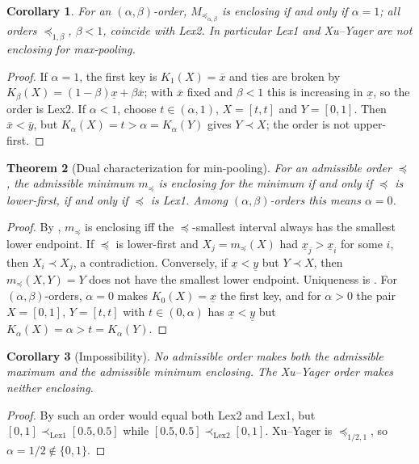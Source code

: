 \documentclass[preprint,12pt]{elsarticle}
\newtheorem{theorem}{Theorem}[section]
\newtheorem{corollary}[theorem]{Corollary}
\theoremstyle{definition}
\newcommand{\lo}[1]{\underline{#1}}
\newcommand{\up}[1]{\overline{#1}}
\begin{document}
\begin{corollary}\label{cor:ab}
For an $(\alpha,\beta)$-order, $M_{\preceq_{\alpha,\beta}}$ is enclosing if and only if $\alpha=1$; all orders $\preceq_{1,\beta}$, $\beta<1$, coincide with Lex2. In particular Lex1 and Xu--Yager are not enclosing for max-pooling.
\end{corollary}

\begin{proof}
If $\alpha=1$, the first key is $K_1(X)=\up x$ and ties are broken by $K_\beta(X)=(1-\beta)\lo x+\beta\up x$; with $\up x$ fixed and $\beta<1$ this is increasing in $\lo x$, so the order is Lex2. If $\alpha<1$, choose $t\in(\alpha,1)$, $X=[t,t]$ and $Y=[0,1]$. Then $\up x<\up y$, but $K_\alpha(X)=t>\alpha=K_\alpha(Y)$ gives $Y\prec X$; the order is not upper-first.
\end{proof}

\begin{theorem}[Dual characterization for min-pooling]\label{thm:min}
For an admissible order $\preceq$, the admissible minimum $m_\preceq$ is enclosing for the minimum if and only if $\preceq$ is lower-first, if and only if $\preceq$ is Lex1. Among $(\alpha,\beta)$-orders this means $\alpha=0$.
\end{theorem}

\begin{proof}
By , $m_\preceq$ is enclosing iff the $\preceq$-smallest interval always has the smallest lower endpoint. If $\preceq$ is lower-first and $X_j=m_\preceq(X)$ had $\lo x_j>\lo x_i$ for some $i$, then $X_i\prec X_j$, a contradiction. Conversely, if $\lo x<\lo y$ but $Y\prec X$, then $m_\preceq(X,Y)=Y$ does not have the smallest lower endpoint. Uniqueness is . For $(\alpha,\beta)$-orders, $\alpha=0$ makes $K_0(X)=\lo x$ the first key, and for $\alpha>0$ the pair $X=[0,1]$, $Y=[t,t]$ with $t\in(0,\alpha)$ has $\lo x<\lo y$ but $K_\alpha(X)=\alpha>t=K_\alpha(Y)$.
\end{proof}

\begin{corollary}[Impossibility]\label{cor:impossible}
No admissible order makes both the admissible maximum and the admissible minimum enclosing. The Xu--Yager order makes neither enclosing.
\end{corollary}

\begin{proof}
By  such an order would equal both Lex2 and Lex1, but $[0,1]\prec_{\mathrm{Lex1}}[0.5,0.5]$ while $[0.5,0.5]\prec_{\mathrm{Lex2}}[0,1]$. Xu--Yager is $\preceq_{1/2,1}$, so $\alpha=1/2\notin\{0,1\}$.
\end{proof}
\end{document}
